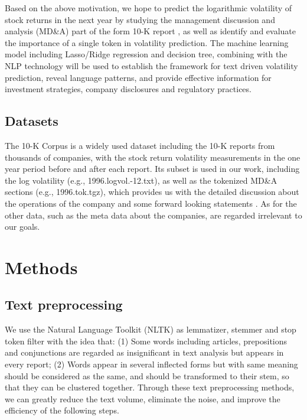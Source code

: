 \documentclass[11pt]{article}
\begin{document}
Based on the above motivation, we hope to predict the logarithmic volatility of stock returns in the next year by studying the management discussion and analysis (MD\&A) part of the form 10-K report \cite{MATTERA20241539}\cite{ma2023stock}, as well as identify and evaluate the importance of a single token in volatility prediction. The machine learning model including Lasso/Ridge regression and decision tree, combining with the NLP technology \cite{yogatama2015sparse} will be used to establish the framework for text driven volatility prediction, reveal language patterns, and provide effective information for investment strategies, company disclosures and regulatory practices.

\subsection{Datasets}

The 10-K Corpus \cite{kogan2009predicting} is a widely used dataset including the 10-K reports from thousands of companies, with the stock return volatility measurements in the one year period before and after each report. Its subset is used in our work, including the log volatility (e.g., 1996.logvol.-12.txt), as well as the tokenized MD\&A sections (e.g., 1996.tok.tgz), which provides us with the detailed discussion about the operations of the company and some forward looking statements \cite{brown2024financial}. As for the other data, such as the meta data about the companies, are regarded irrelevant to our goals.

\section{Methods}

\subsection{Text preprocessing}

We use the Natural Language Toolkit (NLTK) \cite{nltk-py} as lemmatizer, stemmer and stop token filter with the idea that: (1) Some words including articles, prepositions and conjunctions are regarded as insignificant in text analysis but appears in every report; (2) Words appear in several inflected forms but with same meaning should be considered as the same, and should be transformed to their stem, so that they can be clustered together. Through these text preprocessing methods, we can greatly reduce the text volume, eliminate the noise, and improve the efficiency of the following steps.
\end{document}
